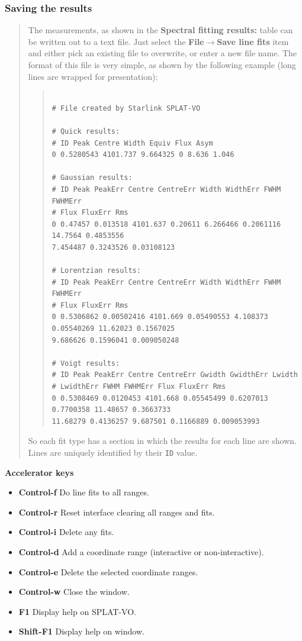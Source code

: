 \documentclass[twoside,11pt]{article}
\newcommand{\latexhtml}[2]{#1}
\renewcommand{\_}{\texttt{\symbol{95}}}
\newcommand{\SPLAT}{\textsf{SPLAT-VO}}
\newcommand{\submenuitem}[2]{\latexhtml{\textbf{#1$\rightarrow$#2}}{\textbf{#1->#2}}}
\newcommand{\labelitem}[1]{\textbf{#1}}
\newcommand{\hitext}[1]{\texttt{#1}}
\newcommand{\subheading}[1]{\textbf{\large{#1}}}
\begin{document}
\subsubsection{Saving the results}
\begin{quote}
 The measurements, as shown in the \labelitem{Spectral fitting
 results:} table can be written out to a text file. Just select the
 \submenuitem{File}{Save line fits} item and either pick an existing file
 to overwrite, or enter a new file name. The format of this file is
 very simple, as shown by the following example (long lines are wrapped
 for presentation):
 \begin{quote}
  \begin{verbatim}

# File created by Starlink SPLAT-VO

# Quick results:
# ID Peak Centre Width Equiv Flux Asym
0 0.5280543 4101.737 9.664325 0 8.636 1.046

# Gaussian results:
# ID Peak PeakErr Centre CentreErr Width WidthErr FWHM FWHMErr
# Flux FluxErr Rms
0 0.47457 0.013518 4101.637 0.20611 6.266466 0.2061116 14.7564 0.4853556
7.454487 0.3243526 0.03108123

# Lorentzian results:
# ID Peak PeakErr Centre CentreErr Width WidthErr FWHM FWHMErr
# Flux FluxErr Rms
0 0.5306862 0.00502416 4101.669 0.05490553 4.108373 0.05540269 11.62023 0.1567025
9.686626 0.1596041 0.009050248

# Voigt results:
# ID Peak PeakErr Centre CentreErr Gwidth GwidthErr Lwidth
# LwidthErr FWHM FWHMErr Flux FluxErr Rms
0 0.5308469 0.0120453 4101.668 0.05545499 0.6207013 0.7700358 11.48657 0.3663733
11.68279 0.4136257 9.687501 0.1166889 0.009053993

  \end{verbatim}
 \end{quote}
 So each fit type has a section in which the results for each line are
 shown. Lines are uniquely identified by their \hitext{ID} value.
\end{quote}

\subheading{Accelerator keys}

\begin{itemize}
\item \labelitem{Control-f} Do line fits to all ranges.
\item \labelitem{Control-r} Reset interface clearing all ranges and fits.
\item \labelitem{Control-i} Delete any fits.

\item \labelitem{Control-d} Add a coordinate range (interactive or non-interactive).
\item \labelitem{Control-e} Delete the selected coordinate ranges.

\item \labelitem{Control-w} Close the window.
\item \labelitem{F1} Display help on \SPLAT.
\item \labelitem{Shift-F1} Display help on window.
\end{itemize}
\end{document}
